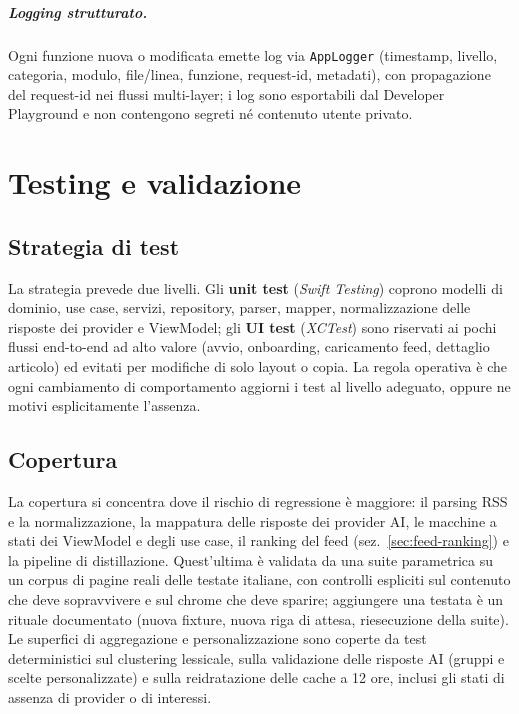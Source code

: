 \paragraph{Logging strutturato.} Ogni funzione nuova o modificata emette
log via \texttt{AppLogger} (timestamp, livello, categoria, modulo,
file/linea, funzione, request-id, metadati), con propagazione del
request-id nei flussi multi-layer; i log sono esportabili dal Developer
Playground e non contengono segreti né contenuto utente privato.

\chapter{Testing e validazione}
\label{cap:testing}

\section{Strategia di test}
La strategia prevede due livelli. Gli \textbf{unit test}
(\emph{Swift Testing}) coprono modelli di dominio, use case, servizi,
repository, parser, mapper, normalizzazione delle risposte dei provider
e ViewModel; gli \textbf{UI test} (\emph{XCTest}) sono riservati ai
pochi flussi end-to-end ad alto valore (avvio, onboarding, caricamento
feed, dettaglio articolo) ed evitati per modifiche di solo layout o
copia. La regola operativa è che ogni cambiamento di comportamento
aggiorni i test al livello adeguato, oppure ne motivi esplicitamente
l'assenza.

\section{Copertura}
La copertura si concentra dove il rischio di regressione è maggiore: il
parsing RSS e la normalizzazione, la mappatura delle risposte dei
provider AI, le macchine a stati dei ViewModel e degli use case, il
ranking del feed (sez.~\ref{sec:feed-ranking}) e la pipeline di
distillazione. Quest'ultima è validata da una suite parametrica su un
corpus di pagine reali delle testate italiane, con controlli espliciti
sul contenuto che deve sopravvivere e sul chrome che deve sparire;
aggiungere una testata è un rituale documentato (nuova fixture, nuova
riga di attesa, riesecuzione della suite). Le superfici di aggregazione
e personalizzazione sono coperte da test deterministici sul clustering
lessicale, sulla validazione delle risposte AI (gruppi e scelte
personalizzate) e sulla reidratazione delle cache a 12 ore, inclusi gli
stati di assenza di provider o di interessi.

